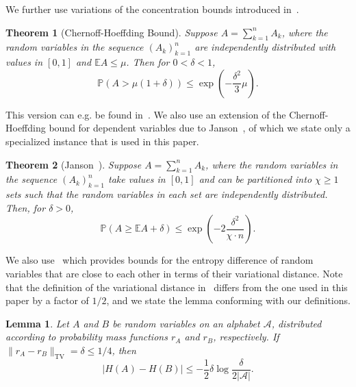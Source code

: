 \documentclass[journal]{IEEEtran}
\newcommand{\lemmaconst}{\delta}
\newcommand{\generalpmf}{r}
\newcommand{\generalrvOne}{A}
\newcommand{\generalrvOneAlph}{\mathcal{A}}
\newcommand{\generalrvTwo}{B}
\newcommand{\generalSummationIndex}{k}
\newcommand{\generalSummationBound}{n}
\newcommand{\coverNumber}{\chi}
\newcommand{\entropy}[1]{H(#1)}
\newcommand{\totalvariation}[1]{\lVert #1 \rVert_\mathrm{TV}}
\newcommand{\absolute}[1]{\left\lvert #1 \right\rvert}
\newcommand{\Expectation}{\mathbb{E}}
\newcommand{\Probability}{\mathbb{P}}
\newcommand{\cardinality}[1]{\lvert #1 \rvert}
\newcommand{\lemmaexpectation}{\mu}
\newtheorem{theorem}{Theorem}
\newtheorem{lemma}{Lemma}
\begin{document}
We further use variations of the concentration bounds introduced in~\cite{HoeffdingInequalities}.
\begin{theorem}[Chernoff-Hoeffding Bound]
\label{theorem:hoeffding}
Suppose $\generalrvOne = \sum_{\generalSummationIndex=1}^{\generalSummationBound} \generalrvOne_\generalSummationIndex$, where the random variables in the sequence $(\generalrvOne_\generalSummationIndex)_{\generalSummationIndex=1}^\generalSummationBound$ are independently distributed with values in $[0,1]$ and $\Expectation \generalrvOne \leq \lemmaexpectation$. Then for $0 < \lemmaconst < 1$,
\[
\Probability(\generalrvOne > \lemmaexpectation(1+\lemmaconst)) \leq \exp\left(-\frac{\lemmaconst^2}{3} \lemmaexpectation \right).
\]
\end{theorem}
This version can e.g. be found in~\cite[Ex. 1.1]{ConcentrationTextbook}. We also use an extension of the Chernoff-Hoeffding bound for dependent variables due to Janson~\cite[Theorem 2.1]{JansonLargeDeviations}, of which we state only a specialized instance that is used in this paper.
\begin{theorem}[Janson~\cite{JansonLargeDeviations}]
\label{theorem:janson}
Suppose $\generalrvOne = \sum_{\generalSummationIndex=1}^{\generalSummationBound} \generalrvOne_\generalSummationIndex$, where the random variables in the sequence $(\generalrvOne_\generalSummationIndex)_{\generalSummationIndex=1}^\generalSummationBound$ take values in $[0,1]$ and can be partitioned into $\coverNumber \geq 1$ sets such that the random variables in each set are independently distributed. Then, for $\lemmaconst > 0$,
\[
\Probability(\generalrvOne \geq \Expectation \generalrvOne + \lemmaconst)
\leq
\exp\left(
  -2 \frac{\lemmaconst^2}
          {\coverNumber \cdot \generalSummationBound}
\right).
\]
\end{theorem}
We also use~\cite[Lemma 2.7]{CsiszarInformation} which provides bounds for the entropy difference of random variables that are close to each other in terms of their variational distance. Note that the definition of the variational distance in~\cite{CsiszarInformation} differs from the one used in this paper by a factor of $1/2$, and we state the lemma conforming with our definitions.
\begin{lemma}
\label{totvar-entropy-lemma}
Let $\generalrvOne$ and $\generalrvTwo$ be random variables on an alphabet $\generalrvOneAlph$, distributed according to probability mass functions $\generalpmf_\generalrvOne$ and $\generalpmf_\generalrvTwo$, respectively. If $\totalvariation{\generalpmf_\generalrvOne - \generalpmf_\generalrvTwo} = \lemmaconst \leq 1/4$, then
\[
\absolute{
  \entropy{\generalrvOne}
  -
  \entropy{\generalrvTwo}
}
\leq
-
\frac{1}{2}
\lemmaconst
\log \frac{\lemmaconst}{2\cardinality{\generalrvOneAlph}}.
\]
\end{lemma}
\end{document}

